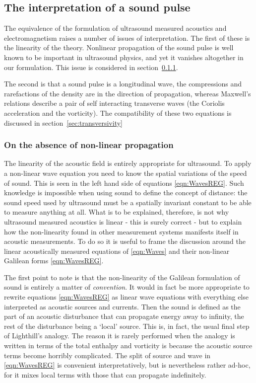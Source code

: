 \documentclass[10pt, fleqn,final,showtrims,oldfontcommands]{article} %
\newcommand{\secref}[1]{section~\ref{sec:#1}}
\newcommand{\eqnref}[1]{\ref{eqn:#1}}
\begin{document}
\subsection{The interpretation of a sound pulse}\label{sec:Interpretations}

The equivalence of the formulation of ultrasound measured acoustics and electromagnetism raises a number of issues of interpretation.
The first of these is the linearity of the theory.
Nonlinear propagation of the sound pulse is well known to be important in ultrasound physics, 
and yet it vanishes altogether in our formulation.
This issue is considered in \secref{NonlinearProp}.

The second is that a sound pulse is a longitudinal wave, the compressions and rarefactions of the density are in the direction of propagation,
whereas Maxwell's relations describe a pair of self interacting transverse waves (the Coriolis acceleration and the vorticity).
The compatibility of these two equations is discussed in \secref{transversivity}

\subsubsection{On the absence of non-linear propagation} \label{sec:NonlinearProp}

The linearity of the acoustic field is entirely appropriate for ultrasound.
To apply a non-linear wave equation you need to know 
the spatial variations of the speed of sound. 
This is seen in the left hand side of equations \eqnref{WavesREG}.
Such knowledge is impossible
when using sound to define the concept of distance:
the sound speed used by ultrasound must be a spatially invariant constant to be able to measure anything at all.
What is to be explained, therefore, 
is not why ultrasound measured acoustics is linear - this is surely correct - 
but to explain how the non-linearity found in other measurement systems  manifests itself in acoustic measurements.
To do so it is useful to frame the discussion around the linear acoustically measured equations of
\eqnref{Waves}
and their non-linear Galilean forms \eqnref{WavesREG}.

The first point to note is that the non-linearity of the Galilean formulation of sound is entirely a matter of {\em  convention}.
It would in fact be more appropriate to rewrite equations \eqnref{WavesREG} as linear wave equations with everything else interpreted as acoustic sources and currents.
Then the sound is defined as the part of an acoustic disturbance that can propagate energy away to infinity,
the rest of the disturbance being a `local' source.
This is, in fact, the usual final step of Lighthill's analogy.
The reason it is rarely performed when the analogy is written in terms of the total enthalpy and vorticity is because
the acoustic source terms become horribly complicated.
The split of source and wave in \eqnref{WavesREG} is convenient  interpretatively, but is nevertheless rather ad-hoc,
for it mixes local terms with those that can propagate indefinitely.
\end{document}
